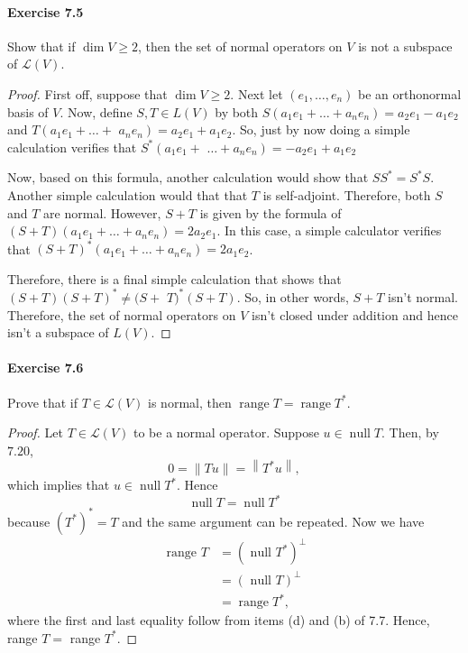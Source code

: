 \documentclass{article}
\theoremstyle{definition}
\begin{document}
\paragraph{Exercise 7.5} Show that if $\operatorname{dim} V \geq 2$, then the set of normal operators on $V$ is not a subspace of $\mathcal{L}(V)$.
\begin{proof}
    First off, suppose that $\operatorname{dim} V \geq 2$. Next let $\left(e_1, \ldots, e_n\right)$ be an orthonormal basis of $V$. Now, define $S, T \in L(V)$ by both $S\left(a_1 e_1+\ldots+a_n e_n\right)=a_2 e_1-a_1 e_2$ and $T\left(a_1 e_1+\ldots+\right.$ $\left.a_n e_n\right)=a_2 e_1+a_1 e_2$. So, just by now doing a simple calculation verifies that $S^*\left(a_1 e_1+\right.$ $\left.\ldots+a_n e_n\right)=-a_2 e_1+a_1 e_2$

Now, based on this formula, another calculation would show that $S S^*=S^* S$. Another simple calculation would that that $T$ is self-adjoint. Therefore, both $S$ and $T$ are normal. However, $S+T$ is given by the formula of $(S+T)\left(a_1 e_1+\ldots+a_n e_n\right)=2 a_2 e_1$. In this case, a simple calculator verifies that $(S+T)^*\left(a_1 e_1+\ldots+a_n e_n\right)=2 a_1 e_2$.

Therefore, there is a final simple calculation that shows that $(S+T)(S+T)^* \neq(S+$ $T)^*(S+T)$. So, in other words, $S+T$ isn't normal. Therefore, the set of normal operators on $V$ isn't closed under addition and hence isn't a subspace of $L(V)$.
\end{proof}



\paragraph{Exercise 7.6} Prove that if $T \in \mathcal{L}(V)$ is normal, then $\operatorname{range} T=\operatorname{range} T^{*}.$
\begin{proof}
    Let $T \in \mathcal{L}(V)$ to be a normal operator.
Suppose $u \in \operatorname{null} T$. Then, by $7.20$,
$$
0=\|T u\|=\left\|T^* u\right\|,
$$
which implies that $u \in \operatorname{null} T^*$.
Hence
$$
\operatorname{null} T=\operatorname{null} T^*
$$
because $\left(T^*\right)^*=T$ and the same argument can be repeated.
Now we have
$$
\begin{aligned}
\text { range } T & =\left(\text { null } T^*\right)^{\perp} \\
& =(\text { null } T)^{\perp} \\
& =\operatorname{range} T^*,
\end{aligned}
$$
where the first and last equality follow from items (d) and (b) of 7.7.
Hence, range $T=$ range $T^*$.
\end{proof}
\end{document}
